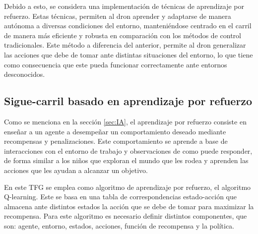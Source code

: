 Debido a esto, se considera una implementación de técnicas de aprendizaje por refuerzo. Estas técnicas, 
permiten al dron aprender y adaptarse de manera autónoma a diversas condiciones del entorno, manteniéndose centrado en el carril de manera más eficiente y robusta en comparación 
con los métodos de control tradicionales. Este método a diferencia del anterior, permite al dron generalizar las acciones que debe de tomar ante distintas situaciones del entorno, lo que tiene
como consecuencia que este pueda funcionar correctamente ante entornos desconocidos.
  \subsection{Sigue-carril basado en aprendizaje por refuerzo}
  \label{sec:aprendizaje por refuerzo}

  Como se menciona en la sección \ref{sec:IA}, el aprendizaje por refuerzo consiste en enseñar a un agente a
  desempeñar un comportamiento deseado mediante recompensas y penalizaciones. Este comportamiento se aprende a base de interacciones con el entorno de trabajo y observaciones de como puede responder,
  de forma similar a los niños que exploran el mundo que les rodea y aprenden las acciones que les ayudan a alcanzar un objetivo. 

  En este TFG se emplea como algoritmo de aprendizaje por refuerzo, el algoritmo Q-learning. Este se basa en una tabla de correspondencias estado-acción que almacena ante distintos estados 
  la acción que se debe de tomar para maximizar la recompensa. Para este algoritmo es necesario definir distintos componentes, que son: agente, entorno, estados, acciones, función de recompensa y 
  la política.
  
